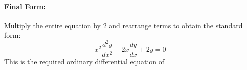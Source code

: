 \documentclass[11pt,a4paper]{article}
\begin{document}
\paragraph{Final Form:}
Multiply the entire equation by $2$ and rearrange terms to obtain the standard form:
\begin{equation}
    x^2\frac{d^2y}{dx^2} - 2x\frac{dy}{dx} + 2y = 0
\end{equation}
This is the required ordinary differential equation of 
\end{document}
